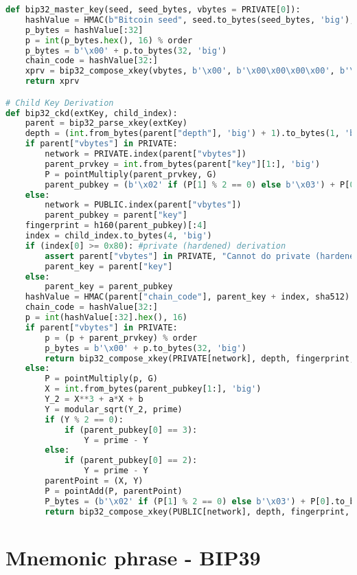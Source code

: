 \begin{lstlisting}[language=Python]
def bip32_master_key(seed, seed_bytes, vbytes = PRIVATE[0]):
	hashValue = HMAC(b"Bitcoin seed", seed.to_bytes(seed_bytes, 'big'), sha512).digest()
	p_bytes = hashValue[:32]
	p = int(p_bytes.hex(), 16) % order
	p_bytes = b'\x00' + p.to_bytes(32, 'big')
	chain_code = hashValue[32:]
	xprv = bip32_compose_xkey(vbytes, b'\x00', b'\x00\x00\x00\x00', b'\x00\x00\x00\x00', chain_code, p_bytes)
	return xprv

# Child Key Derivation
def bip32_ckd(extKey, child_index):
	parent = bip32_parse_xkey(extKey)
	depth = (int.from_bytes(parent["depth"], 'big') + 1).to_bytes(1, 'big')
	if parent["vbytes"] in PRIVATE:
		network = PRIVATE.index(parent["vbytes"])
		parent_prvkey = int.from_bytes(parent["key"][1:], 'big')
		P = pointMultiply(parent_prvkey, G)
		parent_pubkey = (b'\x02' if (P[1] % 2 == 0) else b'\x03') + P[0].to_bytes(32, 'big')
	else:
		network = PUBLIC.index(parent["vbytes"])
		parent_pubkey = parent["key"]
	fingerprint = h160(parent_pubkey)[:4]
	index = child_index.to_bytes(4, 'big')
	if (index[0] >= 0x80): #private (hardened) derivation
		assert parent["vbytes"] in PRIVATE, "Cannot do private (hardened) derivation from Pubkey"
		parent_key = parent["key"]
	else:
		parent_key = parent_pubkey
	hashValue = HMAC(parent["chain_code"], parent_key + index, sha512).digest()
	chain_code = hashValue[32:]
	p = int(hashValue[:32].hex(), 16)
	if parent["vbytes"] in PRIVATE:
		p = (p + parent_prvkey) % order
		p_bytes = b'\x00' + p.to_bytes(32, 'big')
		return bip32_compose_xkey(PRIVATE[network], depth, fingerprint, index, chain_code, p_bytes)
	else:
		P = pointMultiply(p, G)
		X = int.from_bytes(parent_pubkey[1:], 'big')
		Y_2 = X**3 + a*X + b
		Y = modular_sqrt(Y_2, prime)
		if (Y % 2 == 0):
			if (parent_pubkey[0] == 3):
				Y = prime - Y
		else:
			if (parent_pubkey[0] == 2):
				Y = prime - Y
		parentPoint = (X, Y)
		P = pointAdd(P, parentPoint)
		P_bytes = (b'\x02' if (P[1] % 2 == 0) else b'\x03') + P[0].to_bytes(32, 'big')
		return bip32_compose_xkey(PUBLIC[network], depth, fingerprint, index, chain_code, P_bytes)
\end{lstlisting}

\section{Mnemonic phrase - BIP39}


